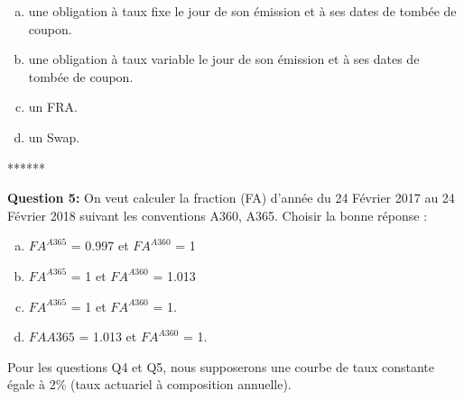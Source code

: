 \documentclass{article}
\newcommand{\indentitem}{\setlength\itemindent{25pt}}
\begin{document}
\begin{enumerate}[a)]
\indentitem \item une obligation à taux fixe le jour de son émission et à ses dates de tombée de coupon.
\indentitem \item une obligation à taux variable le jour de son émission et à ses dates de tombée de coupon.
\indentitem \item un FRA.
\indentitem \item un Swap.
\end{enumerate}
\smallskip
\centerline{******}
\smallskip
\textbf{Question 5:}
On veut calculer la fraction (FA) d’année du 24 Février 2017 au 24 Février 2018 suivant les conventions A360, A365. Choisir la bonne réponse :
\begin{enumerate}[a)]
\indentitem \item $FA^{A365}$ = 0.997 et $FA^{A360}$ = 1
\indentitem \item $FA^{A365}$ = 1 et $FA^{A360}$ = 1.013
\indentitem \item $FA^{A365}$ = 1 et $FA^{A360}$ = 1.
\indentitem \item $FAA365$ = 1.013 et $FA^{A360}$ = 1.
\end{enumerate}
Pour les questions Q4 et Q5, nous supposerons une courbe de taux constante égale à 2\% (taux actuariel à composition annuelle).\\
\end{document}
